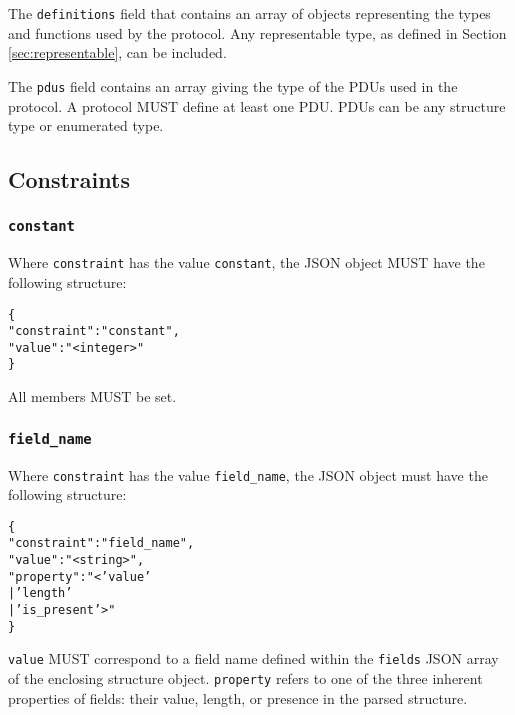 \documentclass[10pt,twocolumn,a4paper]{article}
\newcommand{\code}[1]{\texttt{#1}}
\begin{document}
The \code{definitions} field that contains an array of objects representing
the types and functions used by the protocol. Any representable type, as
defined in Section \ref{sec:representable}, can be included.

The \code{pdus} field contains an array giving the type of the PDUs used
in the protocol. A protocol MUST define at least one PDU. PDUs can be any
structure type or enumerated type. 

\subsection{Constraints}
\label{sec:constraints}

\subsubsection{\texttt{constant}}

Where \texttt{constraint} has the value \texttt{constant}, the JSON object MUST have the
following structure:

\footnotesize
\begin{alltt}
  \{
    "constraint"    : "constant",
    "value"         : "<integer>"
  \}
\end{alltt}
\normalsize

All members MUST be set.

\subsubsection{\texttt{field\_name}}

Where \texttt{constraint} has the value \texttt{field\_name}, the JSON object must have
the following structure:
\footnotesize
\begin{alltt}
  \{
    "constraint" : "field\_name",
    "value"      : "<string>",
    "property"   : "<'value'
                    |'length'
                    |'is\_present'>"
  \}
\end{alltt}
\normalsize
\texttt{value} MUST correspond to a field name defined within the \texttt{fields} JSON
array of the enclosing structure object. \texttt{property} refers to one of the three
inherent properties of fields: their value, length, or presence in the parsed structure.
\end{document}
